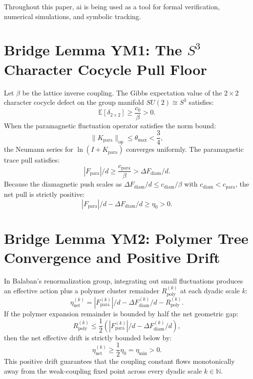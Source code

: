 \documentclass[11pt,a4paper]{article}
\theoremstyle{definition}
\begin{document}
Throughout this paper, ai is being used as a tool for formal verification, numerical simulations, and symbolic tracking.

\section{Bridge Lemma YM1: The $S^3$ Character Cocycle Pull Floor}

Let $\beta$ be the lattice inverse coupling. The Gibbs expectation value of the $2 \times 2$ character cocycle defect on the group manifold $SU(2) \cong S^3$ satisfies:
\begin{equation}
\mathbb{E}[\delta_{2 \times 2}] \ge \frac{c_0}{\beta} > 0.
\end{equation}
When the paramagnetic fluctuation operator satisfies the norm bound:
\begin{equation}
\|K_{\mathrm{para}}\|_{\mathrm{op}} \le \theta_{\max} < \frac{3}{4},
\end{equation}
the Neumann series for $\ln(I + K_{\mathrm{para}})$ converges uniformly. The paramagnetic trace pull satisfies:
\begin{equation}
|F_{\mathrm{para}}|/d \ge \frac{c_{\mathrm{para}}}{\beta} > \Delta F_{\mathrm{diam}}/d.
\end{equation}
Because the diamagnetic push scales as $\Delta F_{\mathrm{diam}}/d \le c_{\mathrm{diam}} / \beta$ with $c_{\mathrm{diam}} < c_{\mathrm{para}}$, the net pull is strictly positive:
\begin{equation}
|F_{\mathrm{para}}|/d - \Delta F_{\mathrm{diam}}/d \ge \eta_0 > 0.
\end{equation}

\section{Bridge Lemma YM2: Polymer Tree Convergence and Positive Drift}

In Balaban's renormalization group, integrating out small fluctuations produces an effective action plus a polymer cluster remainder $R_{\mathrm{poly}}^{(k)}$ at each dyadic scale $k$:
\begin{equation}
\eta_{\mathrm{net}}^{(k)} = |F_{\mathrm{para}}^{(k)}|/d - \Delta F_{\mathrm{diam}}^{(k)}/d - R_{\mathrm{poly}}^{(k)}.
\end{equation}
If the polymer expansion remainder is bounded by half the net geometric gap:
\begin{equation}
R_{\mathrm{poly}}^{(k)} \le \frac{1}{2} \left( |F_{\mathrm{para}}^{(k)}|/d - \Delta F_{\mathrm{diam}}^{(k)}/d \right),
\end{equation}
then the net effective drift is strictly bounded below by:
\begin{equation}
\eta_{\mathrm{net}}^{(k)} \ge \frac{1}{2} \eta_0 = \eta_{\min} > 0.
\end{equation}
This positive drift guarantees that the coupling constant flows monotonically away from the weak-coupling fixed point across every dyadic scale $k \in \mathbb{N}$.
\end{document}
